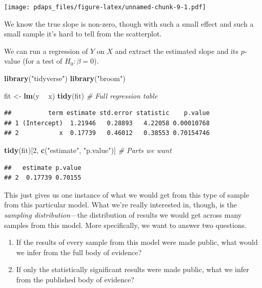 \documentclass[12pt,oneside,openany]{book}
\newenvironment{Shaded}{\begin{snugshade}}{\end{snugshade}}
\newcommand{\KeywordTok}[1]{\textcolor[rgb]{0.13,0.29,0.53}{\textbf{#1}}}
\newcommand{\DecValTok}[1]{\textcolor[rgb]{0.00,0.00,0.81}{#1}}
\newcommand{\StringTok}[1]{\textcolor[rgb]{0.31,0.60,0.02}{#1}}
\newcommand{\CommentTok}[1]{\textcolor[rgb]{0.56,0.35,0.01}{\textit{#1}}}
\newcommand{\OperatorTok}[1]{\textcolor[rgb]{0.81,0.36,0.00}{\textbf{#1}}}
\newcommand{\NormalTok}[1]{#1}
\begin{document}
\texttt{[image: pdaps\_files/figure-latex/unnamed-chunk-9-1.pdf]}

We know the true slope is non-zero, though with such a small effect and
such a small sample it's hard to tell from the scatterplot.

We can run a regression of \(Y\) on \(X\) and extract the estimated
slope and its \(p\)-value (for a test of \(H_0 : \beta = 0\)).

\begin{Shaded}
\begin{Highlighting}[]
\KeywordTok{library}\NormalTok{(}\StringTok{"tidyverse"}\NormalTok{)}
\KeywordTok{library}\NormalTok{(}\StringTok{"broom"}\NormalTok{)}

\NormalTok{fit <-}\StringTok{ }\KeywordTok{lm}\NormalTok{(y }\OperatorTok{~}\StringTok{ }\NormalTok{x)}
\KeywordTok{tidy}\NormalTok{(fit)  }\CommentTok{# Full regression table}
\end{Highlighting}
\end{Shaded}

\begin{verbatim}
##          term estimate std.error statistic    p.value
## 1 (Intercept)  1.21946   0.28893   4.22058 0.00010768
## 2           x  0.17739   0.46012   0.38553 0.70154746
\end{verbatim}

\begin{Shaded}
\begin{Highlighting}[]
\KeywordTok{tidy}\NormalTok{(fit)[}\DecValTok{2}\NormalTok{, }\KeywordTok{c}\NormalTok{(}\StringTok{"estimate"}\NormalTok{, }\StringTok{"p.value"}\NormalTok{)]  }\CommentTok{# Parts we want}
\end{Highlighting}
\end{Shaded}

\begin{verbatim}
##   estimate p.value
## 2  0.17739 0.70155
\end{verbatim}

This just gives us one instance of what we would get from this type of
sample from this particular model. What we're really interested in,
though, is the \emph{sampling distribution}---the distribution of
results we would get across many samples from this model. More
specifically, we want to answer two questions.

\begin{enumerate}
\def\labelenumi{\arabic{enumi}.}
\item
  If the results of every sample from this model were made public, what
  would we infer from the full body of evidence?
\item
  If only the statistically significant results were made public, what
  we infer from the published body of evidence?
\end{enumerate}
\end{document}
